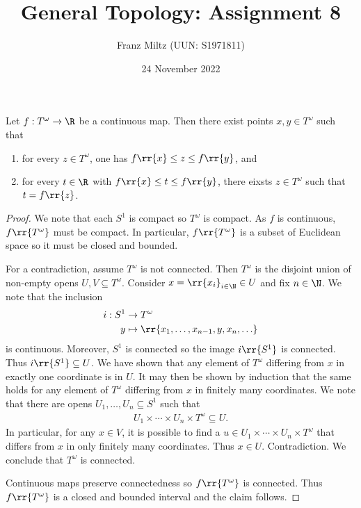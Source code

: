 \documentclass{article}
\begin{document}
\title{General Topology: Assignment 8}
\author{Franz Miltz (UUN: S1971811)}
\date{24 November 2022}
\maketitle

\begin{claim*}[1]
  Let $f:T^\omega\to\R$ be a continuous map. Then there exist points $x,y\in T^\omega$ such that
  \begin{enumerate}
    \item for every $z\in T^\omega$, one has $f\rr{x}\leq z\leq f\rr{y}$, and
    \item for every $t\in\R$ with $f\rr{x}\leq t \leq f\rr{y}$, there eixsts $z\in T^\omega$ such that
      $t=f\rr{z}$.
  \end{enumerate}
  \begin{proof}
    We note that each $S^1$ is compact so $T^\omega$ is compact. As $f$ is continuous, $f\rr{T^\omega}$
    must be compact. In particular, $f\rr{T^\omega}$ is a subset of Euclidean space so it must be closed and bounded.

    For a contradiction, assume $T^\omega$ is not connected. Then $T^\omega$ is the disjoint union
    of non-empty opens $U,V\subseteq T^\omega$. Consider $x=\rr{x_i}_{i\in\N}\in U$ and fix $n\in\N$.
    We note that the inclusion
    \begin{align*}
      i:S^1 &\to T^\omega \\
      y     &\mapsto \rr{x_1,\ldots,x_{n-1},y,x_n,\ldots}
    \end{align*}
    is continuous.
    Moreover, $S^1$ is connected so the image $i\rr{S^1}$ is connected. Thus
    $i\rr{S^1}\subseteq U$. We have shown that any element of $T^\omega$ differing from $x$ in exactly
    one coordinate is in $U$. It may then be shown by induction that the same holds for any
    element of $T^\omega$ differing from $x$ in finitely many coordinates. We note that there
    are opens $U_1,\ldots,U_n\subseteq S^1$ such that
    \begin{align*}
      U_1\times\cdots\times U_n\times T^\omega\subseteq U.
    \end{align*}
    In particular, for any $x\in V$, it is possible to find a $u\in U_1\times\cdots\times U_n\times T^\omega$
    that differs from $x$ in only finitely many coordinates. Thus $x\in U$. Contradiction.
    We conclude that $T^\omega$ is connected.

    Continuous maps preserve connectedness so $f\rr{T^\omega}$ is connected. Thus $f\rr{T^\omega}$
    is a closed and bounded interval and the claim follows.
  \end{proof}
\end{claim*}
\end{document}
